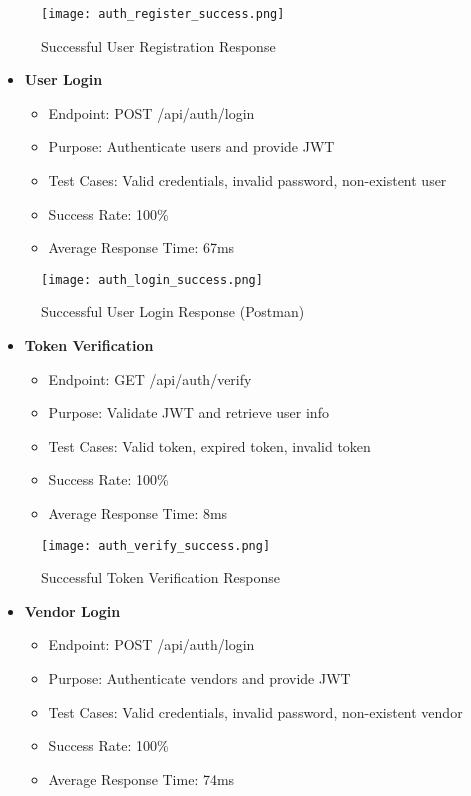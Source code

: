 \begin{figure}[h!]
    \centering
    \texttt{[image: auth\_register\_success.png]}
    \caption{Successful User Registration Response}
    \label{fig:auth_register}
\end{figure}

\begin{itemize}
    \item \textbf{User Login}
    \begin{itemize}
        \item Endpoint: POST /api/auth/login
        \item Purpose: Authenticate users and provide JWT
        \item Test Cases: Valid credentials, invalid password, non-existent user
        \item Success Rate: 100\%
        \item Average Response Time: 67ms
    \end{itemize}
\end{itemize}

\begin{figure}[h!]
    \centering
    \texttt{[image: auth\_login\_success.png]}
    \caption{Successful User Login Response (Postman)}
    \label{fig:auth_login_success}
\end{figure}

\begin{itemize}
    \item \textbf{Token Verification}
    \begin{itemize}
        \item Endpoint: GET /api/auth/verify
        \item Purpose: Validate JWT and retrieve user info
        \item Test Cases: Valid token, expired token, invalid token
        \item Success Rate: 100\%
        \item Average Response Time: 8ms
    \end{itemize}
\end{itemize}

\begin{figure}[h!]
    \centering
    \texttt{[image: auth\_verify\_success.png]}
    \caption{Successful Token Verification Response}
    \label{fig:auth_verify}
\end{figure}

\begin{itemize}
    \item \textbf{Vendor Login}
    \begin{itemize}
        \item Endpoint: POST /api/auth/login
        \item Purpose: Authenticate vendors and provide JWT
        \item Test Cases: Valid credentials, invalid password, non-existent vendor
        \item Success Rate: 100\%
        \item Average Response Time: 74ms
    \end{itemize}
\end{itemize}

